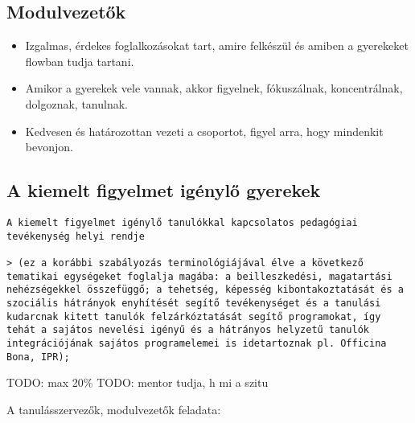 \subsection{Modulvezetők}\label{modulvezetux151k}

\begin{itemize}

\item
  Izgalmas, érdekes foglalkozásokat tart, amire felkészül és amiben a
  gyerekeket flowban tudja tartani.
\item
  Amikor a gyerekek vele vannak, akkor figyelnek, fókuszálnak,
  koncentrálnak, dolgoznak, tanulnak.
\item
  Kedvesen és határozottan vezeti a csoportot, figyel arra, hogy
  mindenkit bevonjon.
\end{itemize}

\subsection{A kiemelt figyelmet igénylő
gyerekek}\label{a-kiemelt-figyelmet-iguxe9nylux151-gyerekek}

\begin{verbatim}
A kiemelt figyelmet igénylő tanulókkal kapcsolatos pedagógiai tevékenység helyi rendje

> (ez a korábbi szabályozás terminológiájával élve a következő tematikai egységeket foglalja magába: a beilleszkedési, magatartási nehézségekkel összefüggő; a tehetség, képesség kibontakoztatását és a szociális hátrányok enyhítését segítő tevékenységet és a tanulási kudarcnak kitett tanulók felzárkóztatását segítő programokat, így tehát a sajátos nevelési igényű és a hátrányos helyzetű tanulók integrációjának sajátos programelemei is idetartoznak pl. Officina Bona, IPR);
\end{verbatim}

TODO: max 20\% TODO: mentor tudja, h mi a szitu

A tanulásszervezők, modulvezetők feladata:


